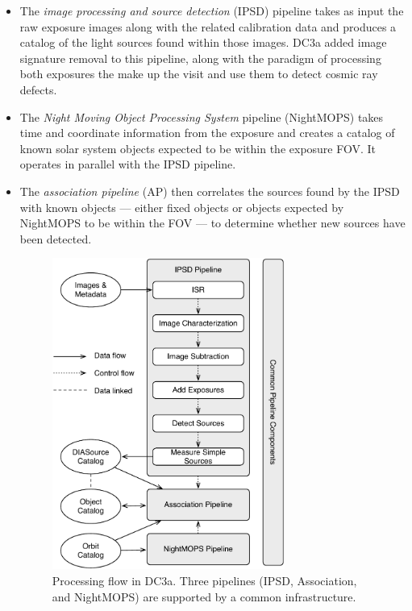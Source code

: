 \begin{itemize}

\item The \textit{image processing and source detection} (IPSD)
  pipeline takes as input the raw exposure images along with the
  related calibration data and produces a catalog of the light sources
  found within those images. DC3a added image signature removal to
  this pipeline, along with the paradigm of processing both exposures
  the make up the visit and use them to detect cosmic ray defects.

\item The \textit{Night Moving Object Processing System} pipeline
  (NightMOPS) takes time and coordinate information from the exposure
  and creates a catalog of known solar system objects expected to be
  within the exposure FOV. It operates in parallel with the IPSD
  pipeline.

\item The \textit{association pipeline} (AP) then correlates the
  sources found by the IPSD with known objects --- either fixed
  objects or objects expected by NightMOPS to be within the FOV --- to
  determine whether new sources have been detected.

\begin{figure}[t]
\begin{center}
\includegraphics[width=3in]{images/DC3aNightly.pdf}
\caption{Processing flow in DC3a. Three pipelines (IPSD, Association, and
NightMOPS) are supported by a common infrastructure.  
\label{fig:dc3apipes}}
\end{center}
\end{figure}


\end{itemize}
